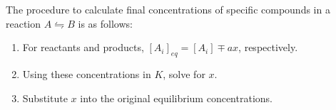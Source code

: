 \documentclass{tufte-book}
\begin{document}
The procedure to calculate final concentrations of specific compounds in a reaction $A \leftrightharpoons B$ is as follows:
\begin{enumerate}
  \item For reactants and products, $[A_i]_{eq} = [A_i] \mp ax$, respectively.
  \item Using these concentrations in $K$, solve for $x$.
  \item Substitute $x$ into the original equilibrium concentrations.
\end{enumerate}
\end{document}
